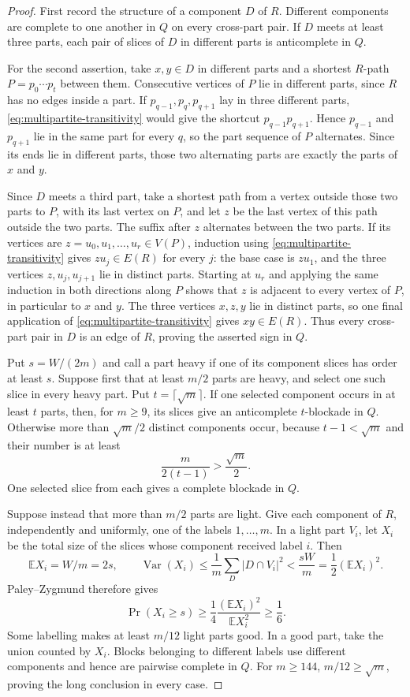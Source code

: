 \documentclass[11pt]{article}
\numberwithin{equation}{section}
\theoremstyle{plain}
\theoremstyle{definition}
\begin{document}
\begin{proof}
First record the structure of a component $D$ of $R$.  Different
components are complete to one another in $Q$ on every cross-part pair.
If $D$ meets at least three parts, each pair of slices of $D$ in
different parts is anticomplete in $Q$.

For the second assertion, take $x,y\in D$ in different parts and a
shortest $R$-path $P=p_0\cdots p_t$ between them.  Consecutive vertices
of $P$ lie in different parts, since $R$ has no edges inside a part.  If
$p_{q-1},p_q,p_{q+1}$ lay in three different parts,
\eqref{eq:multipartite-transitivity} would give the
shortcut $p_{q-1}p_{q+1}$.  Hence $p_{q-1}$ and $p_{q+1}$ lie in the
same part for every $q$, so the part sequence of $P$ alternates.  Since
its ends lie in different parts, those two alternating parts are exactly
the parts of $x$ and $y$.

Since $D$ meets a third part, take a shortest path from a vertex outside
those two parts to $P$, with its last vertex on $P$, and let $z$ be the
last vertex of this path outside the two parts.  The suffix after $z$
alternates between the two parts.  If its vertices are
$z=u_0,u_1,\ldots,u_r\in V(P)$, induction using
\eqref{eq:multipartite-transitivity} gives
$zu_j\in E(R)$ for every $j$: the base case is $zu_1$, and the three
vertices $z,u_j,u_{j+1}$ lie in distinct parts.  Starting at $u_r$ and
applying the same induction in both directions along $P$ shows that $z$
is adjacent to every vertex of $P$, in particular to $x$ and $y$.  The
three vertices $x,z,y$ lie in distinct parts, so one final application
of \eqref{eq:multipartite-transitivity} gives $xy\in E(R)$.  Thus every cross-part pair in $D$ is an
edge of $R$, proving the asserted sign in $Q$.

Put $s=W/(2m)$ and call a part heavy if one of its component slices has
order at least $s$.  Suppose first that at least $m/2$ parts are heavy,
and select one such slice in every heavy part.  Put
$t=\lceil\sqrt m\rceil$.  If one selected component occurs in at least
$t$ parts, then, for $m\geq9$, its slices give an anticomplete
$t$-blockade in $Q$.  Otherwise more than $\sqrt m/2$ distinct
components occur, because $t-1<\sqrt m$ and their number is at least
\[
             \frac{m}{2(t-1)}>\frac{\sqrt m}{2}.
\]
One selected slice from each gives a complete blockade in $Q$.

Suppose instead that more than $m/2$ parts are light.  Give each
component of $R$, independently and uniformly, one of the labels
$1,\ldots,m$.  In a light part $V_i$, let $X_i$ be the total size of the
slices whose component received label $i$.  Then
\[
 \mathbb E X_i=W/m=2s,
 \qquad
 \operatorname{Var}(X_i)
 \leq \frac{1}{m}\sum_D|D\cap V_i|^2
 <\frac{sW}{m}=\frac{1}{2}(\mathbb E X_i)^2.
\]
Paley--Zygmund therefore gives
\[
 \Pr(X_i\geq s)\geq
 \frac{1}{4}\frac{(\mathbb E X_i)^2}{\mathbb E X_i^2}\geq\frac{1}{6}.
\]
Some labelling makes at least $m/12$ light parts good.  In a good part,
take the union counted by $X_i$.  Blocks belonging to different labels
use different components and hence are pairwise complete in $Q$.  For
$m\geq144$, $m/12\geq\sqrt m$, proving the long conclusion in every
case.


\end{proof}
\end{document}
